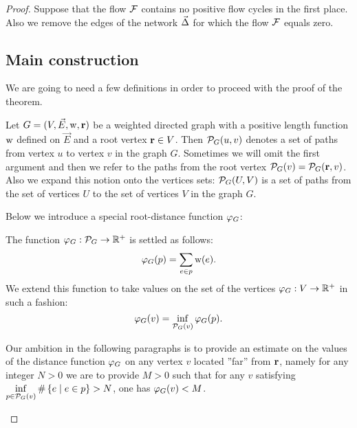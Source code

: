 \documentclass[12pt]{amsart}
\begin{document}
\begin{proof}
      Suppose that the flow $\mathcal{F}$ contains no positive flow cycles in the first place.
      Also we remove the edges of the network $\vec{\Delta}$ for which the flow $\mathcal{F}$ equals zero.

      \subsection{Main construction}
      We are going to need a few definitions in order to proceed with the proof of the theorem.
      \begin{definition}
        Let $G = (V, \vec{E},\mathrm{w}, \mathbf{r})$ be a weighted directed graph with a positive
          length function $\mathrm{w}$ defined on $\vec{E}$ and a root vertex $\mathbf{r} \in V$.
        Then $\mathcal{P}_{G}(u, v)$ denotes a set of paths from vertex $u$ to vertex $v$ in the graph $G$.
        Sometimes we will omit the first argument and then we refer to the paths from the root vertex
          $\mathcal{P}_{G}(v) = \mathcal{P}_{G}(\mathbf{r}, v)$.
        Also we expand this notion onto the vertices sets: $\mathcal{P}_{G}(U,V)$ is a set of paths
          from the set of vertices $U$ to the set of vertices $V$ in the graph $G$.
      \end{definition}
      Below we introduce a special root-distance function $\varphi_{G}$:
      \begin{definition}
        The function $\varphi_{G}: \mathcal{P}_{G} \to \mathbb{R}^{+}$ is settled as follows:
        \[
          \varphi_{G}(p) = \sum_{e \in p} \mathrm{w}(e).
        \]
        We extend this function to take values on the set of the vertices $\varphi_{G}: V \to \mathbb{R}^{+}$ in such a fashion:
        \[
          \varphi_{G}(v) = \inf_{\mathcal{P}_{G}(v)} \varphi_{G}(p).
        \]
      \end{definition}
      \begin{remark}
        Our ambition in the following paragraphs is to provide an estimate on the values of the distance function $\varphi_{G}$ on any vertex $v$
          located ''far'' from $\mathbf{r}$, namely for any integer $N > 0$ we are to provide $M > 0$ such that
          for any $v$ satisfying $\displaystyle\inf_{p \in \mathcal{P}_{G}(v)} \#\left\{ e \mid e \in p\right\} > N$, one has $\varphi_{G}(v) < M$.
      \end{remark}


\end{proof}
\end{document}
